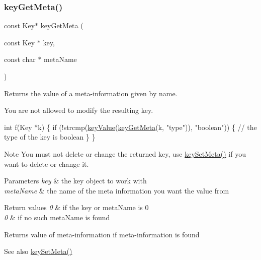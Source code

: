 \subsubsection{\texorpdfstring{key\+Get\+Meta()}{keyGetMeta()}}
{\footnotesize\ttfamily const Key$\ast$ key\+Get\+Meta (\begin{DoxyParamCaption}\item[{const Key $\ast$}]{key,  }\item[{const char $\ast$}]{meta\+Name }\end{DoxyParamCaption})}



Returns the value of a meta-\/information given by name. 

You are not allowed to modify the resulting key.


\begin{DoxyCode}
\textcolor{keywordtype}{int} f(Key *k)
\{
        \textcolor{keywordflow}{if} (!strcmp(\hyperlink{group__keyvalue_ga6f29609c5da53c6dc26a98678d5752af}{keyValue}(\hyperlink{group__keymeta_ga9ed3875495ddb3d8a8d29158a60a147c}{keyGetMeta}(k, \textcolor{stringliteral}{"type"})), \textcolor{stringliteral}{"boolean"}))
        \{
                \textcolor{comment}{// the type of the key is boolean}
        \}
\}
\end{DoxyCode}


\begin{DoxyNote}{Note}
You must not delete or change the returned key, use \hyperlink{group__keymeta_gae1f15546b234ffb6007d8a31178652b9}{key\+Set\+Meta()} if you want to delete or change it.
\end{DoxyNote}

\begin{DoxyParams}{Parameters}
{\em key} & the key object to work with \\
\hline
{\em meta\+Name} & the name of the meta information you want the value from \\
\hline
\end{DoxyParams}

\begin{DoxyRetVals}{Return values}
{\em 0} & if the key or meta\+Name is 0 \\
\hline
{\em 0} & if no such meta\+Name is found \\
\hline
\end{DoxyRetVals}
\begin{DoxyReturn}{Returns}
value of meta-\/information if meta-\/information is found 
\end{DoxyReturn}
\begin{DoxySeeAlso}{See also}
\hyperlink{group__keymeta_gae1f15546b234ffb6007d8a31178652b9}{key\+Set\+Meta()} 
\end{DoxySeeAlso}
\mbox{\label{group__keymeta_ga4c88342f580a4291455a801af71ce048}} 

